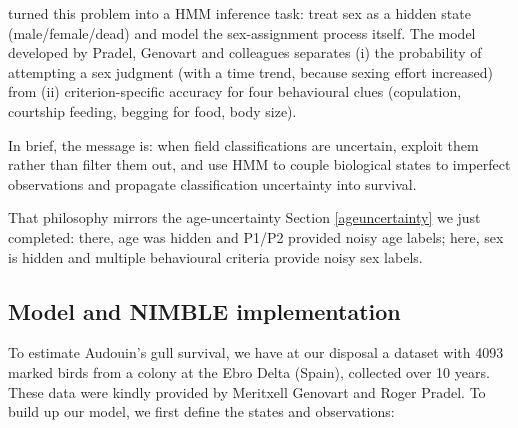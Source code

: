 \documentclass[
  12pt,
]{krantz}
\begin{document}
\citeauthor{pradel2008sex} \citetext{\citeyear{pradel2008sex}; \citealp[see also][]{genovart_exploiting_2012}} turned this problem into a HMM inference task: treat sex as a hidden state (male/female/dead) and model the sex-assignment process itself. The model developed by Pradel, Genovart and colleagues separates (i) the probability of attempting a sex judgment (with a time trend, because sexing effort increased) from (ii) criterion-specific accuracy for four behavioural clues (copulation, courtship feeding, begging for food, body size).

In brief, the message is: when field classifications are uncertain, exploit them rather than filter them out, and use HMM to couple biological states to imperfect observations and propagate classification uncertainty into survival.

That philosophy mirrors the age-uncertainty Section \ref{ageuncertainty} we just completed: there, age was hidden and P1/P2 provided noisy age labels; here, sex is hidden and multiple behavioural criteria provide noisy sex labels.

\subsection{Model and NIMBLE implementation}\label{model-and-nimble-implementation-2}

To estimate Audouin's gull survival, we have at our disposal a dataset with 4093 marked birds from a colony at the Ebro Delta (Spain), collected over 10 years. These data were kindly provided by Meritxell Genovart and Roger Pradel. To build up our model, we first define the states and observations:
\end{document}
